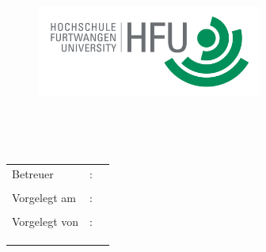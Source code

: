 \begin{titlepage}
\pagestyle{empty}

\begin{flushright}
\begin{figure}[ht]
\flushright
\includegraphics[height=3cm]{content/pictures/hfu.jpg}
\end{figure}
\end{flushright}

\begin{center}
{\fontsize{18}{22} \selectfont \docArtDerArbeit}\\[5mm]
\vspace{1cm}
\begin{onehalfspace}
{\fontsize{22}{26} \selectfont \textbf{\docTitle}}\\[5mm]
{\fontsize{18}{22} \selectfont \docUntertitle}


\end{onehalfspace}
\end{center}

\vfill
\begin{center}
\begin{tabular}{lcl}
Betreuer  		&:& \docErsterReferent 	\\ \\
Vorgelegt am 	&:& \docAbgabedatum 	\\ \\
Vorgelegt von 	&:& \docA\\
				&&	\docB\\
				&&	\docC\\
				&&	\docD\\				
\end{tabular}
\end{center}
\end{titlepage}